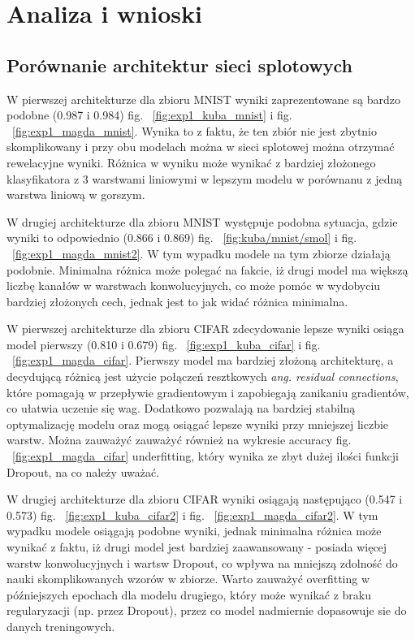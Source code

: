 \documentclass[10pt]{article}
\begin{document}
\pagebreak
\section{Analiza i wnioski}\label{sec:wyniki}
\subsection*{Porównanie architektur sieci splotowych}
W pierwszej architekturze dla zbioru MNIST wyniki zaprezentowane są bardzo podobne (0.987 i 0.984) fig. ~\ref{fig:exp1_kuba_mnist} i fig. ~\ref{fig:exp1_magda_mnist}.
Wynika to z faktu, że ten zbiór nie jest zbytnio skomplikowany i przy obu modelach można w sieci splotowej można otrzymać rewelacyjne wyniki.
Różnica w wyniku może wynikać z bardziej złożonego klasyfikatora z 3 warstwami liniowymi w lepszym modelu w porównanu z jedną warstwa liniową w gorszym.

W drugiej architekturze dla zbioru MNIST występuje podobna sytuacja, gdzie wyniki to odpowiednio (0.866 i 0.869) fig. ~\ref{fig:kuba/mnist/smol} i fig. ~\ref{fig:exp1_magda_mnist2}.
W tym wypadku modele na tym zbiorze działają podobnie.
Minimalna różnica może polegać na fakcie, iż drugi model ma większą liczbę kanałów w warstwach konwolucyjnych, co może pomóc w wydobyciu bardziej złożonych cech, jednak jest to jak widać różnica minimalna.

W pierwszej architekturze dla zbioru CIFAR zdecydowanie lepsze wyniki osiąga model pierwszy (0.810 i 0.679) fig. ~\ref{fig:exp1_kuba_cifar} i fig. ~\ref{fig:exp1_magda_cifar}.
Pierwszy model ma bardziej złożoną architekturę, a decydującą różnicą jest użycie połączeń resztkowych \textit{ang. \textquotedbl{}residual connections\textquotedbl{}}, które pomagają w przepływie gradientowym i zapobiegają zanikaniu gradientów, co ułatwia uczenie się wag.
Dodatkowo pozwalają na bardziej stabilną optymalizację modelu oraz mogą osiągać lepsze wyniki przy mniejszej liczbie warstw.
Można zauważyć zauważyć również na wykresie accuracy fig. ~\ref{fig:exp1_magda_cifar} underfitting, który wynika ze zbyt dużej ilości funkcji Dropout, na co należy uważać.


W drugiej architekturze dla zbioru CIFAR wyniki osiągają następująco (0.547 i 0.573) fig. ~\ref{fig:exp1_kuba_cifar2} i fig. ~\ref{fig:exp1_magda_cifar2}.
W tym wypadku modele osiągają podobne wyniki, jednak minimalna różnica może wynikać z faktu, iż drugi model jest bardziej zaawansowany - posiada więcej warstw konwolucyjnych i wartsw Dropout, co wpływa na mniejszą zdolność do nauki skomplikowanych wzorów w zbiorze.
Warto zauważyć overfitting w późniejszych epochach dla modelu drugiego, który może wynikać z braku regularyzacji (np.
przez Dropout), przez co model nadmiernie dopasowuje sie do danych treningowych.
\end{document}
